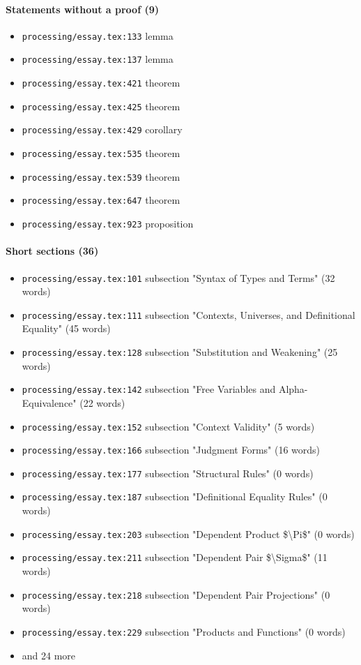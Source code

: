 \documentclass[11pt]{article}
\newcommand{\loc}[1]{{\small\color{muted}\texttt{#1}}}
\begin{document}
\paragraph{Statements without a proof (9)}
\begin{itemize}
\item \loc{processing/\allowbreak{}essay.tex:133} lemma
\item \loc{processing/\allowbreak{}essay.tex:137} lemma
\item \loc{processing/\allowbreak{}essay.tex:421} theorem
\item \loc{processing/\allowbreak{}essay.tex:425} theorem
\item \loc{processing/\allowbreak{}essay.tex:429} corollary
\item \loc{processing/\allowbreak{}essay.tex:535} theorem
\item \loc{processing/\allowbreak{}essay.tex:539} theorem
\item \loc{processing/\allowbreak{}essay.tex:647} theorem
\item \loc{processing/\allowbreak{}essay.tex:923} proposition
\end{itemize}
\paragraph{Short sections (36)}
\begin{itemize}
\item \loc{processing/\allowbreak{}essay.tex:101} subsection "Syntax of Types and Terms" (32 words)
\item \loc{processing/\allowbreak{}essay.tex:111} subsection "Contexts, Universes, and Definitional Equality" (45 words)
\item \loc{processing/\allowbreak{}essay.tex:128} subsection "Substitution and Weakening" (25 words)
\item \loc{processing/\allowbreak{}essay.tex:142} subsection "Free Variables and Alpha-Equivalence" (22 words)
\item \loc{processing/\allowbreak{}essay.tex:152} subsection "Context Validity" (5 words)
\item \loc{processing/\allowbreak{}essay.tex:166} subsection "Judgment Forms" (16 words)
\item \loc{processing/\allowbreak{}essay.tex:177} subsection "Structural Rules" (0 words)
\item \loc{processing/\allowbreak{}essay.tex:187} subsection "Definitional Equality Rules" (0 words)
\item \loc{processing/\allowbreak{}essay.tex:203} subsection "Dependent Product \$\textbackslash{}Pi\$" (0 words)
\item \loc{processing/\allowbreak{}essay.tex:211} subsection "Dependent Pair \$\textbackslash{}Sigma\$" (11 words)
\item \loc{processing/\allowbreak{}essay.tex:218} subsection "Dependent Pair Projections" (0 words)
\item \loc{processing/\allowbreak{}essay.tex:229} subsection "Products and Functions" (0 words)
\item[] {\color{muted}\small and 24 more}
\end{itemize}
\end{document}
